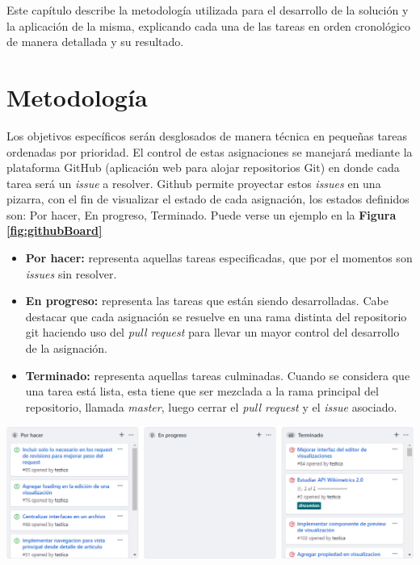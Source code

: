 Este capítulo describe la metodología utilizada para el desarrollo de la solución y la aplicación de la misma, explicando cada una de las tareas en orden cronológico de manera detallada y su resultado.

\section{Metodología}
Los objetivos específicos serán desglosados de manera técnica en pequeñas tareas ordenadas por prioridad. El control de estas asignaciones se manejará mediante la plataforma GitHub (aplicación web para alojar repositorios Git) en donde cada tarea será un \textit{issue} a resolver. Github permite proyectar estos \textit{issues} en una pizarra, con el fin de visualizar el estado de cada asignación, los estados definidos son: Por hacer, En progreso, Terminado. Puede verse un ejemplo en la \textbf{Figura \ref{fig:githubBoard}}

\begin{itemize}
\item\textbf{Por hacer:} representa aquellas tareas especificadas, que por el momentos son \textit{issues} sin resolver.
\item\textbf{En progreso:} representa las tareas que están siendo desarrolladas. Cabe destacar que cada asignación se resuelve en una rama distinta del repositorio git haciendo uso del \textit{pull request} para llevar un mayor control del desarrollo de la asignación.
\item\textbf{Terminado:} representa aquellas tareas culminadas. Cuando se considera que una tarea está lista, esta tiene que ser mezclada a la rama principal del repositorio, llamada \textit{master}, luego cerrar el \textit{pull request} y el \textit{issue} asociado.
\end{itemize}

\begin{center}
    \bigbreak
    \includegraphics[scale=0.4]{images/marco_aplicativo/github_board.png}
    \label{fig:githubBoard}
    \bigbreak
\end{center}

